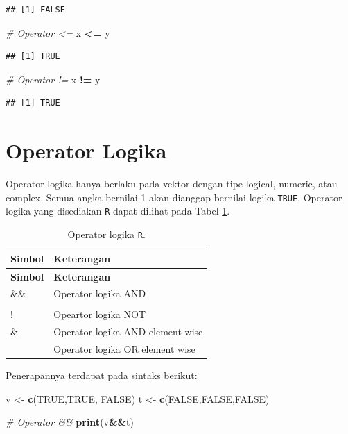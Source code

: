 \documentclass[]{book}
\newenvironment{Shaded}{\begin{snugshade}}{\end{snugshade}}
\newcommand{\KeywordTok}[1]{\textcolor[rgb]{0.13,0.29,0.53}{\textbf{#1}}}
\newcommand{\StringTok}[1]{\textcolor[rgb]{0.31,0.60,0.02}{#1}}
\newcommand{\CommentTok}[1]{\textcolor[rgb]{0.56,0.35,0.01}{\textit{#1}}}
\newcommand{\OtherTok}[1]{\textcolor[rgb]{0.56,0.35,0.01}{#1}}
\newcommand{\OperatorTok}[1]{\textcolor[rgb]{0.81,0.36,0.00}{\textbf{#1}}}
\newcommand{\NormalTok}[1]{#1}
\begin{document}
\begin{verbatim}
## [1] FALSE
\end{verbatim}

\begin{Shaded}
\begin{Highlighting}[]
\CommentTok{# Operator <=}
\NormalTok{x }\OperatorTok{<=}\StringTok{ }\NormalTok{y}
\end{Highlighting}
\end{Shaded}

\begin{verbatim}
## [1] TRUE
\end{verbatim}

\begin{Shaded}
\begin{Highlighting}[]
\CommentTok{# Operator !=}
\NormalTok{x }\OperatorTok{!=}\StringTok{ }\NormalTok{y}
\end{Highlighting}
\end{Shaded}

\begin{verbatim}
## [1] TRUE
\end{verbatim}

\section{Operator Logika}\label{operator-logika}

Operator logika hanya berlaku pada vektor dengan tipe logical, numeric,
atau complex. Semua angka bernilai 1 akan dianggap bernilai logika
\texttt{TRUE}. Operator logika yang disediakan \texttt{R} dapat dilihat
pada Tabel \ref{tab:oplogika}.

\begin{longtable}[]{@{}ll@{}}
\caption{\label{tab:oplogika} Operator logika \texttt{R}.}\tabularnewline
\toprule
\textbf{Simbol} & \textbf{Keterangan}\tabularnewline
\midrule
\endfirsthead
\toprule
\textbf{Simbol} & \textbf{Keterangan}\tabularnewline
\midrule
\endhead
\&\& & Operator logika AND\tabularnewline
&\tabularnewline
! & Opeartor logika NOT\tabularnewline
\& & Operator logika AND element wise\tabularnewline
& Operator logika OR element wise\tabularnewline
\bottomrule
\end{longtable}

Penerapannya terdapat pada sintaks berikut:

\begin{Shaded}
\begin{Highlighting}[]
\NormalTok{v <-}\StringTok{ }\KeywordTok{c}\NormalTok{(}\OtherTok{TRUE}\NormalTok{,}\OtherTok{TRUE}\NormalTok{, }\OtherTok{FALSE}\NormalTok{)}
\NormalTok{t <-}\StringTok{ }\KeywordTok{c}\NormalTok{(}\OtherTok{FALSE}\NormalTok{,}\OtherTok{FALSE}\NormalTok{,}\OtherTok{FALSE}\NormalTok{)}

\CommentTok{# Operator &&}
\KeywordTok{print}\NormalTok{(v}\OperatorTok{&&}\NormalTok{t)}
\end{Highlighting}
\end{Shaded}
\end{document}
